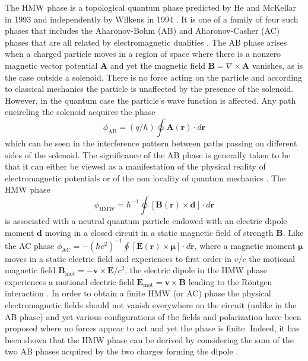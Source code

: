The HMW phase is a topological quantum phase predicted by He and McKellar in 1993 \cite{mckellar93} and independently by Wilkens in 1994 \cite{wilkens94}. It is one of a family of four such phases that includes the Aharonov-Bohm (AB) \cite{aharanov59} and Aharonov-Casher (AC) \cite{aharanov84} phases that are all related by electromagnetic dualities  \cite{dowling99}. The AB phase arises when a charged particle moves in a region of space where there is a nonzero magnetic vector potential $\mathbf{A}$ and yet the magnetic field $\mathbf{B}= \nabla \times \mathbf{A}$ vanishes, as is the case outside a solenoid. There is no force acting on the particle and according to classical mechanics the particle is unaffected by the presence of the solenoid. However, in the quantum case the particle's wave function is affected. Any path encircling the solenoid acquires the phase 
\begin{equation}
\phi_{\mathrm{AB}}=(q/ \hbar) \oint \mathbf{A}(\mathbf{r}) \cdot d \mathbf r
\label{eq:phiAB}
\end{equation}
 which can be seen in the interference pattern between paths passing on different sides of the solenoid. The significance of the AB phase is generally taken to be that it can either be viewed as a manifestation of the physical reality of electromagnetic potentials or of the non locality of quantum mechanics \cite{vaidmann}.  The HMW phase \cite{mckellar93,wilkens94}
 \begin{equation}
 \phi_{\mathrm{HMW}} = \hbar^{-1} \oint [\mathbf{B}(\mathbf{r}) \times \mathbf {d}] \cdot d \mathbf r 
 \label{eq:phiHMW}
 \end{equation}
  is associated with a neutral quantum particle endowed with an electric dipole moment $\mathbf{d}$ moving in a closed circuit in a static magnetic field of strength $\mathbf{B}$. Like the AC phase $\phi_{\mathrm{AC}} = -(\hbar c^2)^{-1} \oint [\mathbf{E}(\mathbf{r}) \times \boldsymbol{\mu}] \cdot d \mathbf r $, where a magnetic moment $\boldsymbol{\mu}$ moves in a static electric field and experiences to first order in $v/c$ the motional magnetic field $\mathbf{B}_{\mathrm{mot}} = - \mathbf{v} \times \mathbf{E} /c^2$, the electric dipole in the HMW phase  experiences a motional electric field $\mathbf{E}_{\mathrm{mot}} = \mathbf{v} \times \mathbf{B}$ leading to the R\"{o}ntgen interaction \cite{wilkens94}. In order to obtain a finite HMW (or AC) phase the physical electromagnetic fields should not vanish everywhere on the circuit (unlike in the AB phase) and yet various configurations of the fields and polarization have been proposed \cite{mckellar93,wilkens94,dowling99,wei95} where no forces appear to act and yet the phase is finite.  Indeed, it has been shown that the HMW phase can be derived by considering the sum of the two AB phases acquired by the two charges forming the dipole \cite{wei95}. 
